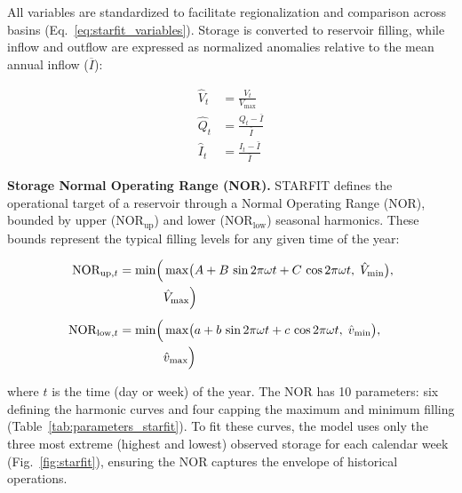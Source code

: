 \documentclass[hess, manuscript]{copernicus}
\begin{document}
All variables are standardized to facilitate regionalization and comparison across basins (Eq.~\ref{eq:starfit_variables}). Storage is converted to reservoir filling, while inflow and outflow are expressed as normalized anomalies relative to the mean annual inflow ($\overline{I}$): 

\begin{subequations}
\label{eq:starfit_variables}
    \begin{align}
        \hat{V}_{t} &= \frac{V_t}{V_{\max}} \label{eq:standard_volume} \\
        \hat{Q}_{t} &= \frac{Q_t - \bar{I}}{\bar{I}} \label{eq:standard_outflow} \\
        \hat{I}_{t} &= \frac{I_t - \bar{I}}{\bar{I}} \label{eq:standard_inflow}
    \end{align}
\end{subequations}

\medskip
\textbf{Storage Normal Operating Range (NOR).} STARFIT defines the operational target of a reservoir through a Normal Operating Range (NOR), bounded by upper ($\text{NOR}_{\text{up}}$) and lower ($\text{NOR}_{\text{low}}$) seasonal harmonics. These bounds represent the typical filling levels for any given time of the year:

{\small
\begin{equation}
\label{eq:starfit_nor}
    \begin{alignedat}{2}
        \text{NOR}_{\text{up},t}   &= \min \Bigl( && \max \bigl( A + B \, \sin 2\pi\omega t + C \, \cos 2\pi\omega t, \; \hat{V}_{\min} \bigr), \\
                                   &              && \hat{V}_{\max} \Bigr) \\[1ex]
        \text{NOR}_{\text{low},t}  &= \min \Bigl( && \max \bigl( a + b \, \sin 2\pi\omega t + c \, \cos 2\pi\omega t, \; \hat{v}_{\min} \bigr), \\
                                   &              && \hat{v}_{\max} \Bigr) 
    \end{alignedat}
\end{equation}
}

where $t$ is the time (day or week) of the year. The NOR has 10 parameters: six defining the harmonic curves and four capping the maximum and minimum filling (Table~\ref{tab:parameters_starfit}). To fit these curves, the model uses only the three most extreme (highest and lowest) observed storage for each calendar week (Fig.~\ref{fig:starfit}), ensuring the NOR captures the envelope of historical operations.
\end{document}
